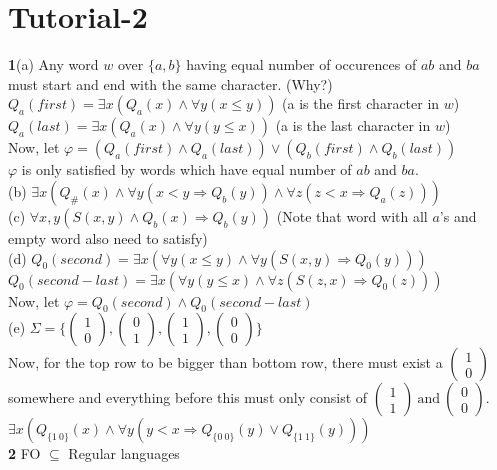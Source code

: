 \chapter*{Tutorial-2}
\textbf{1}(a) Any word $w$ over $\{a,b\}$ having equal number of occurences of $ab$ and $ba$ must start and end with the same character. (Why?)\\
$Q_a(first)=\exists x(Q_a(x)\wedge \forall y(x\leq y))$ (a is the first character in $w$)\\
$Q_a(last)=\exists x(Q_a(x)\wedge \forall y(y\leq x))$ (a is the last character in $w$)\\
Now, let $\varphi=(Q_a(first)\wedge Q_a(last))\vee (Q_b(first)\wedge Q_b(last))$\\
$\varphi$ is only satisfied by words which have equal number of $ab$ and $ba$.\\
(b) $\exists x(Q_{\#}(x)\wedge \forall y(x<y\Rightarrow Q_b(y))\wedge \forall z(z<x \Rightarrow Q_a(z)))$\\
(c) $\forall x,y(S(x,y)\wedge Q_b(x)\Rightarrow Q_b(y))$ (Note that word with all $a$'s and empty word also need to satisfy)\\
(d) $Q_0(second)=\exists x(\forall y(x\leq y)\wedge \forall y(S(x,y)\Rightarrow Q_0(y)))$\\
$Q_0(second-last)= \exists x(\forall y(y\leq x)\wedge \forall z(S(z,x)\Rightarrow Q_0(z)))$\\
Now, let $\varphi=Q_0(second)\wedge Q_0(second-last)$ \\
(e) $\Sigma=\{\begin{pmatrix} 1\\0\end{pmatrix},\begin{pmatrix} 0\\1\end{pmatrix},\begin{pmatrix} 1\\1\end{pmatrix},\begin{pmatrix} 0\\0\end{pmatrix}\}$\\
Now, for the top row to be bigger than bottom row, there must exist a $\begin{pmatrix} 1\\0\end{pmatrix}$ somewhere and everything before this must only consist of $\begin{pmatrix}1\\1\end{pmatrix}\:\text{and}\:\begin{pmatrix}0\\0\end{pmatrix}.$\\
$\exists x(Q_{\{1\:0\}}(x)\wedge \forall y(y<x \Rightarrow Q_{\{0\:0\}}(y)\vee Q_{\{1\:1\}}(y)))$\\
\textbf{2} FO $\subseteq$ Regular languages
